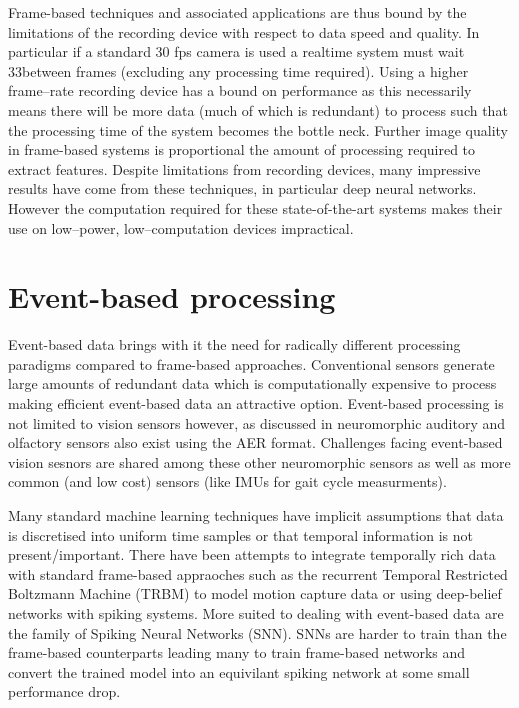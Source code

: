 Frame-based techniques and associated applications are thus bound by the limitations of the recording device with respect to data speed and quality. 
In particular if a standard 30 fps camera is used a realtime system must wait 33\ms between frames (excluding any processing time required). 
Using a higher frame--rate recording device has a bound on performance as this necessarily means there will be more data (much of which is redundant) to process such that the processing time of the system becomes the bottle neck. 
Further image quality in frame-based systems is proportional the amount of processing required to extract features.
Despite limitations from recording devices, many impressive results have come from these techniques, in particular deep neural networks\cite{krizhevsky2012imagenet}.
However the computation required for these state-of-the-art systems makes their use on low--power, low--computation devices impractical. 



\pagebreak
\section{Event-based processing}     %
Event-based data brings with it the need for radically different processing paradigms compared to frame-based approaches\cite{perez2013mapping, martin2015spiking, tan2015benchmarking}.
Conventional sensors generate large amounts of redundant data which is computationally expensive to process making efficient event-based data an attractive option\cite{vanarse2016review}. 
Event-based processing is not limited to vision sensors however, as discussed in \cite{vanarse2016review} neuromorphic auditory and olfactory sensors also exist using the AER format. 
Challenges facing event-based vision sesnors are shared among these other neuromorphic sensors as well as more common (and low cost) sensors (like IMUs for gait cycle measurments\cite{fida2015pre}).

Many standard machine learning techniques have implicit assumptions that data is discretised into uniform time samples or that temporal information is not present/important.
There have been attempts to integrate temporally rich data with standard frame-based appraoches such as the recurrent Temporal Restricted Boltzmann Machine (TRBM)\cite{sutskever2009recurrent} to model motion capture data or using deep-belief networks with spiking systems\cite{Neftci2014, pedroni2013neuromorphic, OConnor2013}.
More suited to dealing with event-based data are the family of Spiking Neural Networks (SNN)\cite{henderson2015spike, perez2013mapping}.
SNNs are harder to train than the frame-based counterparts leading many to train frame-based networks and convert the trained model into an equivilant spiking network at some small performance drop\cite{perez2013mapping, pedroni2013neuromorphic, OConnor2013}.

